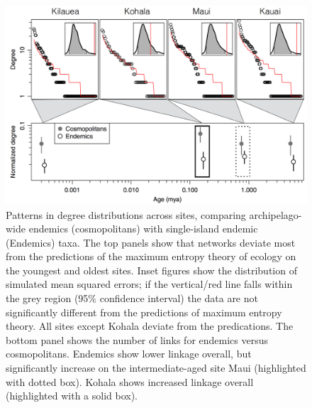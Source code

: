 \begin{figure}[!hp] 
  \centering
  \includegraphics[scale=0.35]{figs/fig_degree.pdf}
  \caption[Patterns in degree distributions across sites]{Patterns in
degree distributions across sites, comparing archipelago-wide endemics
(cosmopolitans) with single-island endemic (Endemics) taxa. The top
panels show that networks deviate most from the predictions of the
maximum entropy theory of ecology on the youngest and oldest
sites. Inset figures show the distribution of simulated mean squared
errors; if the vertical/red line falls within the grey region (95\%
confidence interval) the data are not significantly different from the
predictions of maximum entropy theory. All sites except Kohala deviate
from the predications. The bottom panel shows the number of links for
endemics versus cosmopolitans. Endemics show lower linkage overall,
but significantly increase on the intermediate-aged site Maui
(highlighted with dotted box). Kohala shows increased linkage overall
(highlighted with a solid box).}
  \label{fig:degree}
\end{figure}

